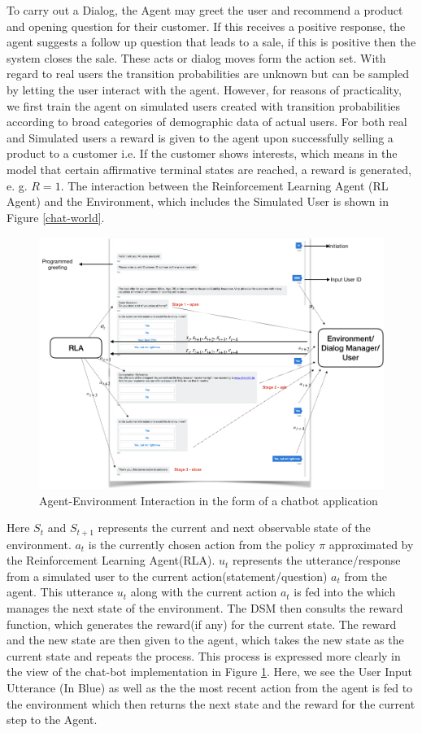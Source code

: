\documentclass[12pt]{extarticle}
\numberwithin{equation}{section}
\begin{document}
	To carry out a Dialog, the Agent may greet the user and recommend a product and opening question for their customer. If this receives a positive response, the agent suggests a follow up question that leads to a sale, if this is positive then the system closes the sale. These acts or dialog moves form the action set. With regard to real users the transition probabilities are unknown but can be sampled by letting the user interact with the agent. However, for reasons of practicality, we first train the agent on simulated users created with transition probabilities according to broad categories of demographic data of actual users. For both real and Simulated users a reward is given to the  agent upon successfully selling a product to a customer i.e. If the customer shows interests, which means in the model that certain affirmative terminal states are reached, a reward is generated, e. g. $R = 1$. The interaction between the Reinforcement Learning Agent (RL Agent) and the Environment, which includes the Simulated User is shown in Figure \ref{chat-world}.
	\begin{figure}[H]
		\vspace{0.2cm}
		\centering
		\includegraphics[scale=0.5]{user-env3}
		\caption{Agent-Environment Interaction in the form of a chatbot application
			\label{chat-world2}}
	\end{figure}
	Here $S_t$ and $S_{t+1}$ represents the current and next observable state of the environment. $a_t$ is the currently chosen action from the policy $\pi$ approximated by the Reinforcement Learning Agent(RLA). $u_t$ represents the utterance/response from a simulated user to the current action(statement/question) $a_t$ from the agent. This utterance $u_t$ along with the current action $a_t$ is fed into the  which manages the next state of the environment. The DSM then consults the reward function, which generates the reward(if any) for the current state. The reward and the new state are then given to the agent, which takes the new state as the current state and repeats the process. This process is expressed more clearly in the view of the chat-bot implementation in Figure \ref{chat-world2}. Here, we see the User Input Utterance (In Blue) as well as the the most recent action from the agent is fed to the environment which then returns the next state and the reward for the current step to the Agent.
\end{document}
